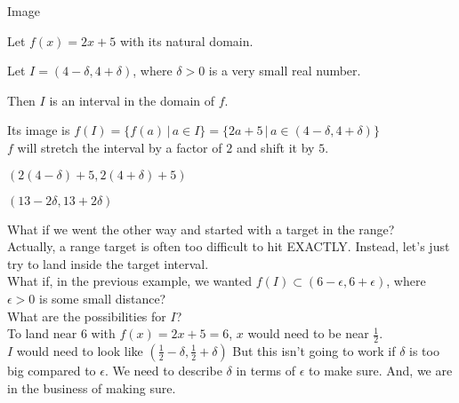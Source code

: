 \documentclass{ximera}
\begin{document}
\begin{example} Image

Let $f(x) = 2x + 5$ with its natural domain.

Let  $I = (4-\delta, 4+\delta)$, where $\delta > 0$ is a very small real number.

Then $I$ is an interval in the domain of $f$.


Its image is $f(I) = \{   f(a)  \, | \, a \in I \}  = \{   2a+5  \, | \, a \in (4-\delta, 4+\delta) \}$  \\



$f$ will stretch the interval by a factor of $2$ and shift it by $5$.


$(2(4-\delta)+5, 2(4+\delta)+5)$


$(13-2\delta, 13+2\delta)$






\end{example}













What if we went the other way and started with a target in the range? \\

Actually, a range target is often too difficult to hit EXACTLY.  Instead, let's just try to land inside the target interval. \\



What if, in the previous example, we wanted $f(I) \subset (6-\epsilon, 6+\epsilon)$, where $\epsilon > 0$ is some small distance?  \\


What are the possibilities for $I$?  \\







To land near $6$ with $f(x) = 2x + 5 = 6$, $x$ would need to be near $\frac{1}{2}$.  \\

$I$ would need to look like $\left( \frac{1}{2} - \delta, \frac{1}{2}+ \delta \right)$  But this isn't going to work if $\delta$ is too big compared to $\epsilon$.  We need to describe $\delta$ in terms of $\epsilon$ to make sure.  And, we are in the business of making sure. \\
\end{document}
